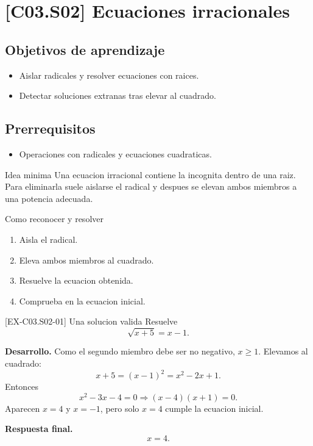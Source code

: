 \section{[C03.S02] Ecuaciones irracionales}

\subsection*{Objetivos de aprendizaje}
\begin{itemize}
  \item Aislar radicales y resolver ecuaciones con raices.
  \item Detectar soluciones extranas tras elevar al cuadrado.
\end{itemize}

\subsection*{Prerrequisitos}
\begin{itemize}
  \item Operaciones con radicales y ecuaciones cuadraticas.
\end{itemize}

\begin{theorybox}{Idea minima}
Una ecuacion irracional contiene la incognita dentro de una raiz. Para eliminarla suele
aislarse el radical y despues se elevan ambos miembros a una potencia adecuada.
\end{theorybox}

\begin{methodbox}{Como reconocer y resolver}
\begin{enumerate}
  \item Aisla el radical.
  \item Eleva ambos miembros al cuadrado.
  \item Resuelve la ecuacion obtenida.
  \item Comprueba en la ecuacion inicial.
\end{enumerate}
\end{methodbox}

\begin{solvedexample}{[EX-C03.S02-01] Una solucion valida}
Resuelve
\[
\sqrt{x+5}=x-1.
\]

\textbf{Desarrollo.} Como el segundo miembro debe ser no negativo, \(x\geq 1\). Elevamos al
cuadrado:
\[
x+5=(x-1)^2=x^2-2x+1.
\]
Entonces
\[
x^2-3x-4=0 \Longrightarrow (x-4)(x+1)=0.
\]
Aparecen \(x=4\) y \(x=-1\), pero solo \(x=4\) cumple la ecuacion inicial.

\textbf{Respuesta final.}
\[
x=4.
\]
\end{solvedexample}

